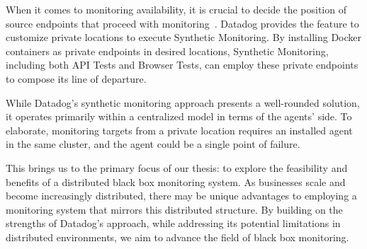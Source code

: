 When it comes to monitoring availability, it is crucial to decide the position of source endpoints that proceed with monitoring~\parencite{datadog_run_nodate}. Datadog provides the feature to customize private locations to execute Synthetic Monitoring. By installing Docker containers as private endpoints in desired locations, Synthetic Monitoring, including both API Tests and Browser Tests, can employ these private endpoints to compose its line of departure. 

While Datadog's synthetic monitoring approach presents a well-rounded solution, it operates primarily within a centralized model in terms of the agents' side. To elaborate, monitoring targets from a private location requires an installed agent in the same cluster, and the agent could be a single point of failure. 

This brings us to the primary focus of our thesis: to explore the feasibility and benefits of a distributed black box monitoring system. As businesses scale and become increasingly distributed, there may be unique advantages to employing a monitoring system that mirrors this distributed structure. By building on the strengths of Datadog's approach, while addressing its potential limitations in distributed environments, we aim to advance the field of black box monitoring. 